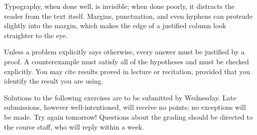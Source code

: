 \documentclass[11pt]{article}
\begin{document}
Typography, when done well, is invisible; when done poorly, it distracts
the reader from the text itself. Margins, punctuation, and even hyphens can
protrude slightly into the margin, which makes the edge of a justified column
look straighter to the eye.

Unless a problem explicitly says otherwise, every answer must be justified by
a proof. A counterexample must satisfy all of the hypotheses and must be
checked explicitly. You may cite results proved in lecture or recitation,
provided that you identify the result you are using.

Solutions to the following exercises are to be submitted by Wednesday. Late
submissions, however well-intentioned, will receive no points; no exceptions
will be made. Try again tomorrow! Questions about the grading should be
directed to the course staff, who will reply within a week.
\end{document}

